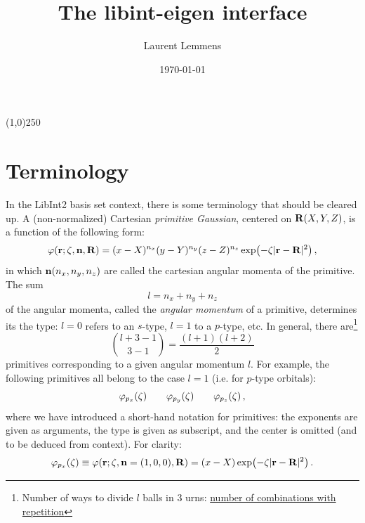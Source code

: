 \documentclass[12pt]{article}
\title{The libint-eigen interface}
\author{Laurent Lemmens}
\date{\today \hspace{6pt} \currenttime}
\begin{document}
\maketitle

\begin{center}
\line(1,0){250}
\end{center}

\tableofcontents
\newpage



\section{Terminology}
    In the LibInt2 basis set context, there is some terminology that should be cleared up. A (non-normalized) Cartesian \textit{primitive Gaussian}, centered on $\vb{R}(X,Y,Z)$, is a function of the following form:
    \begin{equation}
        \varphi(\vb{r}; \zeta, \vb{n}, \vb{R}) = (x - X)^{n_x} (y - Y)^{n_y} (z - Z)^{n_z} \exp(-\zeta |\vb{r}-\vb{R}|^2) \thinspace ,
    \end{equation}
    in which $\vb{n}(n_x, n_y, n_z)$ are called the cartesian angular momenta of the primitive. The sum
    \begin{equation}
        l = n_x + n_y + n_z
    \end{equation}
    of the angular momenta, called the \textit{angular momentum} of a primitive, determines its the type: $l=0$ refers to an $s$-type, $l=1$ to a $p$-type, etc. In general, there are\footnote{Number of ways to divide $l$ balls in $3$ urns: \href{https://en.wikipedia.org/wiki/Combination\#Number\_of\_combinations\_with\_repetition}{number of combinations with repetition}}
    \begin{equation}
        \binom{l + 3 - 1}{3 - 1} = \frac{(l+1)(l+2)}{2}
    \end{equation}
    primitives corresponding to a given angular momentum $l$. For example, the following primitives all belong to the case $l=1$ (i.e. for $p$-type orbitals):
    \begin{equation}
        \varphi_{p_x}(\zeta) \qquad \varphi_{p_y}(\zeta) \qquad \varphi_{p_z}(\zeta) \thinspace ,
    \end{equation}
    where we have introduced a short-hand notation for primitives: the exponents are given as arguments, the type is given as subscript, and the center is omitted (and to be deduced from context). For clarity:
    \begin{equation}
        \varphi_{p_x}(\zeta) \equiv \varphi(\vb{r}; \zeta, \vb{n}=(1,0,0), \vb{R}) = (x - X) \exp(-\zeta |\vb{r}-\vb{R}|^2) \thinspace .
    \end{equation}
\end{document}
